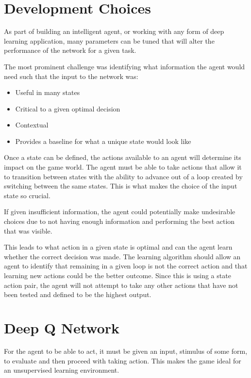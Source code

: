 \section{Development Choices}

As part of building an intelligent agent, or working with any form of deep
learning application, many parameters can be tuned that will alter the
performance of the network for a given task.

The most prominent challenge was identifying what information the agent would
need such that the input to the network was:

\begin{itemize}
    \item Useful in many states
    \item Critical to a given optimal decision
    \item Contextual
    \item Provides a baseline for what a unique state would look like
\end{itemize}

Once a state can be defined, the actions available to an agent will determine
its impact on the game world. The agent must be able to take actions that allow
it to transition between states with the ability to advance out of a loop
created by switching between the same states. This is what makes the choice of
the input state so crucial.

If given insufficient information, the agent could potentially make undesirable
choices due to not having enough information and performing the best action that
was visible.

This leads to what action in a given state is optimal and can the agent learn
whether the correct decision was made. The learning algorithm should allow an
agent to identify that remaining in a given loop is not the correct action and
that learning new actions could be the better outcome. Since this is using a
state action pair, the agent will not attempt to take any other actions that
have not been tested and defined to be the highest output.

\section{Deep Q Network}

For the agent to be able to act, it must be given an input, stimulus of some
form, to evaluate and then proceed with taking action. This makes the game
ideal for an unsupervised learning environment.

